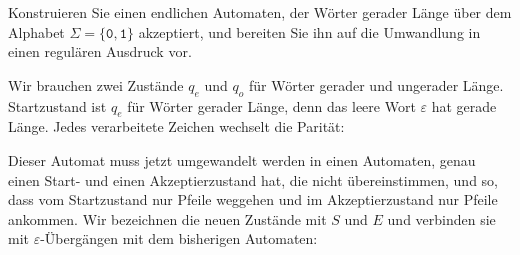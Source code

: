 Konstruieren Sie einen endlichen Automaten, der Wörter gerader Länge
über dem Alphabet $\Sigma=\{\texttt{0},\texttt{1}\}$ akzeptiert,
und bereiten Sie ihn auf die Umwandlung in einen regulären Ausdruck vor.

\begin{loesung}
Wir brauchen zwei Zustände $q_e$ und $q_o$ für Wörter gerader und
ungerader Länge.
Startzustand ist $q_e$ für Wörter gerader Länge, denn das leere Wort
$\varepsilon$ hat gerade Länge.
Jedes verarbeitete Zeichen wechselt die Parität:
\def\l{3}
\def\r{0.4}
\def\zustand#1#2#3{
        \draw[color=#3] #1 circle[radius=\r];
        \node[color=#3] at #1 {$#2\mathstrut$};
}
\def\akzeptierzustand#1#2#3{
        \zustand{#1}{#2}{#3}
        \draw[color=#3] #1 circle[radius={\r-0.05}];
}
\begin{center}
\end{center}
Dieser Automat muss jetzt umgewandelt werden in einen Automaten, genau
einen Start- und einen Akzeptierzustand hat, die nicht übereinstimmen,
und so, dass vom Startzustand nur Pfeile weggehen und im Akzeptierzustand
nur Pfeile ankommen.
Wir bezeichnen die neuen Zustände mit $S$ und $E$ und verbinden sie mit
$\varepsilon$-Übergängen mit dem bisherigen Automaten:
\begin{center}
\end{center}
\end{loesung}

